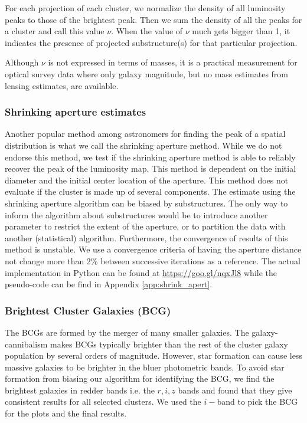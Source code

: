 For each projection of each cluster, we normalize the density of all 
luminosity peaks to those of the brightest peak. 
Then we sum the density of all the peaks for a cluster and call this value
$\nu$. When the value of $\nu$ much gets bigger than 1, it indicates the presence 
of projected substructure(s) for that particular projection.

Although $\nu$ is not expressed in terms of masses, it is a practical measurement
for optical survey data where only galaxy magnitude, but no mass estimates from lensing
estimates, are available. 

\subsubsection{Shrinking aperture estimates}

Another popular method among astronomers for finding the peak of a spatial
distribution is what we call the shrinking aperture method.
While we do not endorse this method,
we test if the shrinking aperture method is able to reliably recover the 
peak of the luminosity map.
This method is dependent on the initial diameter and the initial center 
location of the aperture.
This method does not evaluate if the cluster is made up of
several components.
The estimate using the shrinking aperture algorithm can be biased by
substructures. The only way to inform the algorithm about substructures would
be to introduce another parameter to restrict the extent of the aperture, or to
partition the data with another (statistical) algorithm.
Furthermore, the convergence of results of this method is unstable. We use a
convergence criteria of having the aperture distance not change more than 2\% 
between successive iterations as a reference. The actual implementation in
Python can be found at \href{https://goo.gl/nqxJl8}{https://goo.gl/nqxJl8} while
the pseudo-code can be find in Appendix \ref{app:shrink_apert}.

\subsubsection{Brightest Cluster Galaxies (BCG)}
The BCGs are formed by the merger of many smaller
galaxies. The galaxy-cannibalism makes BCGs typically brighter than the rest of 
the cluster galaxy population by several orders of magnitude. 
However, star formation can cause
less massive galaxies to be brighter in the bluer photometric bands.
To avoid star formation from biasing our algorithm for identifying the
BCG, we find the brightest galaxies in redder bands i.e. the $r, i, z$
bands and found that they give consistent results for all selected clusters. 
We used the $i-$band to pick the BCG for the plots and the final results. 

